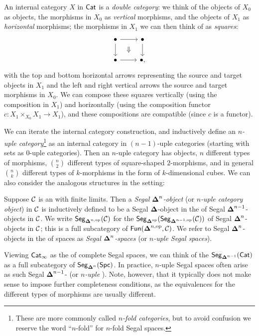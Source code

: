 \documentclass[a4paper,11pt]{article}
\begin{document}
\begin{ex}
  An internal category $X$ in $\textup{\textsf{Cat}}$ is a \emph{double category}: we
  think of the objects of $X_{0}$ as objects, the morphisms in $X_{0}$
  as \emph{vertical} morphisms, and the objects of $X_{1}$ as
  \emph{horizontal} morphisms; the morphisms in $X_{1}$ we can then
  think of as \emph{squares}:
  \[
    \begin{tikzcd}
      \bullet \ar[r] \ar[d] \ar[dr, phantom, "\Downarrow"] & \bullet \ar[d] \\
      \bullet \ar[r] & \bullet,
    \end{tikzcd}
  \]
  with the top and bottom horizontal arrows representing the source
  and target objects in $X_{1}$ and the left and right vertical arrows
  the source and target morphisms in $X_{0}$. We can compose these
  squares vertically (using the composition in $X_{1}$) and
  horizontally (using the composition functor
  $c \colon X_{1} \times_{X_{0}} X_{1} \to X_{1}$), and these
  compositions are compatible (since $c$ is a functor).
\end{ex}

We can iterate the internal category construction, and inductively
define an \emph{$n$-uple category}\footnote{These are more commonly
  called \emph{$n$-fold categories}, but to avoid confusion we reserve
  the word ``$n$-fold'' for $n$-fold Segal spaces.} as an internal
category in $(n-1)$-uple categories (starting with sets as $0$-uple
categories). 
Then an $n$-uple category has objects, $n$ different
types of morphisms, $\binom{n}{2}$ different types of square-shaped
$2$-morphisms, and in general $\binom{n}{k}$ different types of
$k$-morphisms in the form of $k$-dimensional cubes. We can also
consider the analogous structures in the \icatl{} setting:
\begin{defn}
  Suppose $\mathcal{C}$ is an \icat{} with finite limits. Then a \emph{Segal
    $\boldsymbol{\Delta}^{n}$-object} (or \emph{$n$-uple category object}) in $\mathcal{C}$
  is inductively defined to be a Segal $\boldsymbol{\Delta}$-object in the \icat{}
  of Segal $\boldsymbol{\Delta}^{n-1}$-objects in $\mathcal{C}$. We write
  $\textup{\textsf{Seg}}_{\boldsymbol{\Delta}^{n,\text{\textup{op}}}}(\mathcal{C})$ for the \icat{}
  $\textup{\textsf{Seg}}_{\boldsymbol{\Delta}^{\text{\textup{op}}}}(\textup{\textsf{Seg}}_{\boldsymbol{\Delta}^{n-1,\text{\textup{op}}}}(\mathcal{C}))$ of Segal $\boldsymbol{\Delta}^{n}$-objects in
  $\mathcal{C}$; this is a full subcategory of $\textup{\textsf{Fun}}(\boldsymbol{\Delta}^{n,\text{\textup{op}}}, \mathcal{C})$. We refer to
  Segal $\boldsymbol{\Delta}^{n}$-objects in the \icat{} of spaces as \emph{Segal
    $\boldsymbol{\Delta}^{n}$-spaces} (or \emph{$n$-uple
  Segal spaces}).
\end{defn}

\begin{remark}
  Viewing $\textup{\textsf{Cat}}_\infty$ as the \icat{} of complete Segal spaces, we can
  think of the \icat{} $\textup{\textsf{Seg}}_{\boldsymbol{\Delta}^{n-1}}(\textup{\textsf{Cat}})$ as a full subcategory of
  $\textup{\textsf{Seg}}_{\boldsymbol{\Delta}^{n}}(\textup{\textsf{Spc}})$. In practice, $n$-uple Segal spaces often
  arise as such Segal $\boldsymbol{\Delta}^{n-1}$-\icats{} (or \emph{$n$-uple
    \icats{}}). Note, however, that it typically does not make sense
  to impose further completeness conditions, as the equivalences for
  the different types of morphisms are usually different.
\end{remark}
\end{document}
